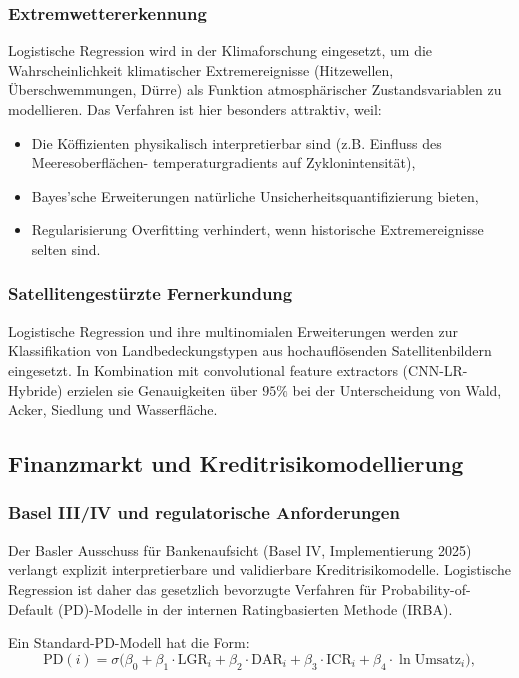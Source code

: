﻿\documentclass[12pt, a4paper]{article}
\theoremstyle{definition}
\theoremstyle{remark}
\newcommand{\sigmoid}{\sigma}
\begin{document}
\subsubsection{Extremwettererkennung}

Logistische Regression wird in der Klimaforschung eingesetzt, um die Wahrscheinlichkeit
klimatischer Extremereignisse (Hitzewellen, Überschwemmungen, Dürre) als Funktion
atmosphärischer Zustandsvariablen zu modellieren. Das Verfahren ist hier besonders
attraktiv, weil:
\begin{itemize}
  \item Die Köffizienten physikalisch interpretierbar sind (z.B. Einfluss des Meeresoberflächen-
    temperaturgradients auf Zyklonintensität),
  \item Bayes'sche Erweiterungen natürliche Unsicherheitsquantifizierung bieten,
  \item Regularisierung Overfitting verhindert, wenn historische Extremereignisse selten sind.
\end{itemize}

\subsubsection{Satellitengestürzte Fernerkundung}

Logistische Regression und ihre multinomialen Erweiterungen werden zur Klassifikation von
Landbedeckungstypen aus hochauflösenden Satellitenbildern eingesetzt. In Kombination mit
convolutional feature extractors (CNN-LR-Hybride) erzielen sie Genauigkeiten über $95\%$
bei der Unterscheidung von Wald, Acker, Siedlung und Wasserfläche.

\subsection{Finanzmarkt und Kreditrisikomodellierung}

\subsubsection{Basel III/IV und regulatorische Anforderungen}

Der Basler Ausschuss für Bankenaufsicht (Basel IV, Implementierung 2025) verlangt explizit
interpretierbare und validierbare Kreditrisikomodelle. Logistische Regression ist daher das
gesetzlich bevorzugte Verfahren für Probability-of-Default (PD)-Modelle in der internen
Ratingbasierten Methode (IRBA).

Ein Standard-PD-Modell hat die Form:
\begin{equation}
  \mathrm{PD}(i) = \sigmoid\!\bigl(\beta_0 + \beta_1 \cdot \text{LGR}_i + \beta_2 \cdot \text{DAR}_i
  + \beta_3 \cdot \text{ICR}_i + \beta_4 \cdot \ln\text{Umsatz}_i\bigr),
\end{equation}
\end{document}
